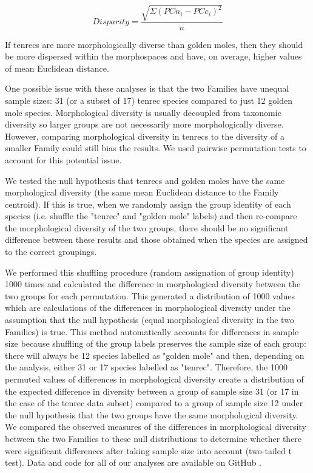 \documentclass[12pt,a4paper]{article}
\begin{document}
	\begin{equation}
		Disparity = \frac{\sqrt{\Sigma(PCn_{i}-PCc_{i})^2}}{n}
	\end{equation}

	If tenrecs are more morphologically diverse than golden moles, then they should be more dispersed within the morphospaces and have, on average, higher values of mean Euclidean distance. 	

	One possible issue with these analyses is that the two Families have unequal sample sizes: 31 (or a subset of 17) tenrec species compared to just 12 golden mole species. Morphological diversity is usually decoupled from taxonomic diversity \citep[e.g.][]{Ruta2013, Hopkins2013} so larger groups are not necessarily more morphologically diverse. However, comparing morphological diversity in tenrecs to the diversity of a smaller Family could still bias the results. We used pairwise permutation tests to account for this potential issue. 

	We tested the null hypothesis that tenrecs and golden moles have the same morphological diversity (the same mean Euclidean distance to the Family centroid). If this is true, when we randomly assign the group identity of each species (i.e. shuffle the "tenrec" and "golden mole" labels) and then re-compare the morphological diversity of the two groups, there should be no significant difference between these results and those obtained when the species are assigned to the correct groupings. 
	
	We performed this shuffling procedure (random assignation of group identity) 1000 times and calculated the difference in morphological diversity between the two groups for each permutation. This generated a distribution of 1000 values which are calculations of the differences in morphological diversity under the assumption that the null hypothesis (equal morphological diversity in the two Families) is true. This method automatically accounts for differences in sample size because shuffling of the group labels preserves the sample size of each group: there will always be 12 species labelled as "golden mole" and then, depending on the analysis, either 31 or 17 species labelled as "tenrec". Therefore, the 1000 permuted values of differences in morphological diversity create a distribution of the expected difference in diversity between a group of sample size 31 (or 17 in the case of the tenrec data subset) compared to a group of sample size 12 under the null hypothesis that the two groups have the same morphological diversity. We compared the observed measures of the differences in morphological diversity between the two Families to these null distributions to determine whether there were significant differences after taking sample size into account (two-tailed t test). Data and code for all of our analyses are available on GitHub \citep{Finlay2015c}.
\end{document}
